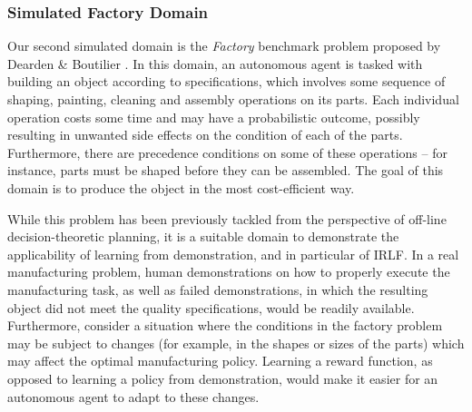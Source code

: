 \documentclass[a4paper,11pt]{report}
\begin{document}


\subsubsection{Simulated Factory Domain}
Our second simulated domain is the \emph{Factory} benchmark problem proposed by Dearden \& Boutilier \cite{dearden1997abstraction}. In this domain, an autonomous agent is tasked with building an object according to specifications, which involves some sequence of shaping, painting, cleaning and assembly operations on its parts. Each individual operation costs some time and may have a probabilistic outcome, possibly resulting in unwanted side effects on the condition of each of the parts. Furthermore, there are precedence conditions on some of these operations -- for instance, parts must be shaped before they can be assembled. The goal of this domain is to produce the object in the most cost-efficient way.

While this problem has been previously tackled from the perspective of off-line decision-theoretic planning, it is a suitable domain to demonstrate the applicability of learning from demonstration, and in particular of IRLF. In a real manufacturing problem, human demonstrations on how to properly execute the manufacturing task, as well as failed demonstrations, in which the resulting object did not meet the quality specifications, would be readily available. Furthermore, consider a situation where the conditions in the factory problem may be subject to changes (for example, in the shapes or sizes of the parts) which may affect the optimal manufacturing policy. Learning a reward function, as opposed to learning a policy from demonstration, would make it easier for an autonomous agent to adapt to these changes.
\end{document}
